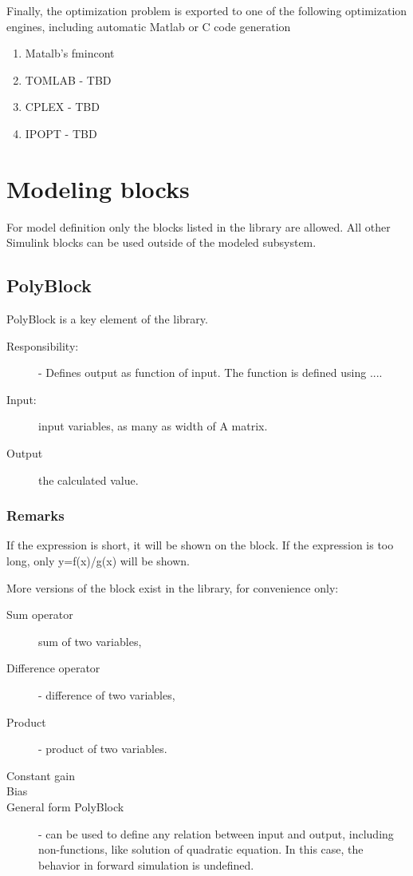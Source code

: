 \documentclass {article}
\begin{document}
Finally, the optimization problem is exported to one of the following
optimization engines, including automatic Matlab or C code generation  
\begin{enumerate}
\item Matalb's fmincont
\item TOMLAB - TBD
\item CPLEX - TBD
\item IPOPT - TBD
\end{enumerate}



\section{Modeling blocks} 
For model definition only the blocks listed in the library are allowed. All
other Simulink blocks can be used outside of the modeled subsystem. 

\subsection{PolyBlock}
PolyBlock  is a key element of the library.
\begin{description}
  \item [Responsibility:] - Defines output as function of input. The function
    is defined using ....
\item [Input:] input variables, as many as width of A matrix.
\item [Output] the calculated value.
\end{description}

\subsubsection{Remarks}
 If the expression is short, it will be shown on the block. If the expression is too long, only y=f(x)/g(x) will be shown.

More versions of the block exist in the library, for convenience only:
\begin{description}
  \item [Sum operator] sum of two variables,
\item [Difference operator] - difference of two variables,
\item [Product] - product of two variables.
\item [Constant gain]
\item [Bias]
\item [General form PolyBlock] - can be used to define any relation between input and output, including non-functions, like solution of quadratic equation. In this case, the behavior in forward simulation is undefined. 
\end{description}
\end{document}
